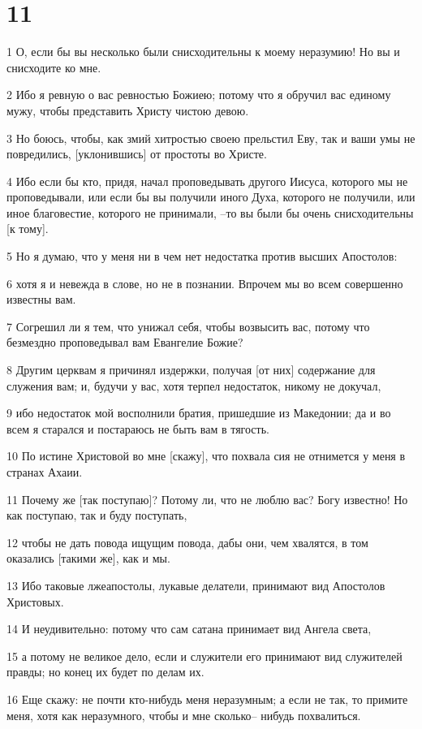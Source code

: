 \chapter{11}

\par 1 О, если бы вы несколько были снисходительны к моему неразумию! Но вы и снисходите ко мне.
\par 2 Ибо я ревную о вас ревностью Божиею; потому что я обручил вас единому мужу, чтобы представить Христу чистою девою.
\par 3 Но боюсь, чтобы, как змий хитростью своею прельстил Еву, так и ваши умы не повредились, [уклонившись] от простоты во Христе.
\par 4 Ибо если бы кто, придя, начал проповедывать другого Иисуса, которого мы не проповедывали, или если бы вы получили иного Духа, которого не получили, или иное благовестие, которого не принимали, --то вы были бы очень снисходительны [к тому].
\par 5 Но я думаю, что у меня ни в чем нет недостатка против высших Апостолов:
\par 6 хотя я и невежда в слове, но не в познании. Впрочем мы во всем совершенно известны вам.
\par 7 Согрешил ли я тем, что унижал себя, чтобы возвысить вас, потому что безмездно проповедывал вам Евангелие Божие?
\par 8 Другим церквам я причинял издержки, получая [от них] содержание для служения вам; и, будучи у вас, хотя терпел недостаток, никому не докучал,
\par 9 ибо недостаток мой восполнили братия, пришедшие из Македонии; да и во всем я старался и постараюсь не быть вам в тягость.
\par 10 По истине Христовой во мне [скажу], что похвала сия не отнимется у меня в странах Ахаии.
\par 11 Почему же [так поступаю]? Потому ли, что не люблю вас? Богу известно! Но как поступаю, так и буду поступать,
\par 12 чтобы не дать повода ищущим повода, дабы они, чем хвалятся, в том оказались [такими же], как и мы.
\par 13 Ибо таковые лжеапостолы, лукавые делатели, принимают вид Апостолов Христовых.
\par 14 И неудивительно: потому что сам сатана принимает вид Ангела света,
\par 15 а потому не великое дело, если и служители его принимают вид служителей правды; но конец их будет по делам их.
\par 16 Еще скажу: не почти кто-нибудь меня неразумным; а если не так, то примите меня, хотя как неразумного, чтобы и мне сколько-- нибудь похвалиться.
